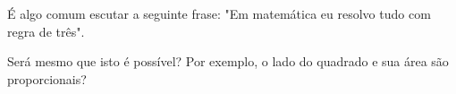 
É algo comum escutar a seguinte frase: "Em matemática eu
resolvo tudo com regra de três".

Será mesmo que isto é possível? Por exemplo, o lado do
quadrado e sua área são proporcionais?